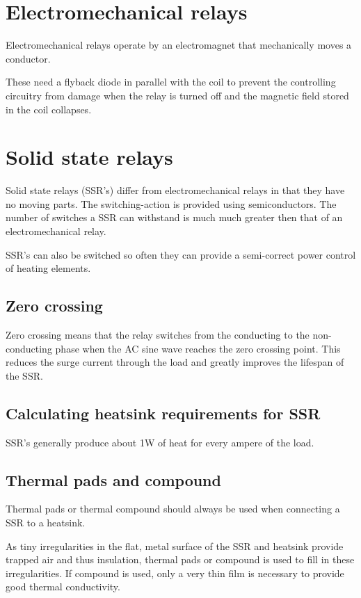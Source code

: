 \documentclass[11pt,fleqn]{book} %
\begin{document}
\section{Electromechanical relays}

Electromechanical relays operate by an electromagnet that mechanically moves a conductor.

These need a flyback diode in parallel with the coil to prevent the controlling circuitry from damage when the relay is turned off and the magnetic field stored in the coil collapses. 

\section{Solid state relays}

Solid state relays (SSR's) differ from electromechanical relays in that they have no moving parts. The switching-action is provided using semiconductors. The number of switches a SSR can withstand is much much greater then that of an electromechanical relay.

SSR's can also be switched so often they can provide a semi-correct power control of heating elements. 

\subsection{Zero crossing}

Zero crossing means that the relay switches from the conducting to the non-conducting phase when the AC sine wave reaches the zero crossing point. This reduces the surge current through the load and greatly improves the lifespan of the SSR.

\subsection{Calculating heatsink requirements for SSR}

SSR's generally produce about 1W of heat for every ampere of the load.

\subsection{Thermal pads and compound}

Thermal pads or thermal compound should always be used when connecting a SSR to a heatsink.

As tiny irregularities in the flat, metal surface of the SSR and heatsink provide trapped air and thus insulation, thermal pads or compound is used to fill in these irregularities. If compound is used, only a very thin film is necessary to provide good thermal conductivity.
\end{document}
